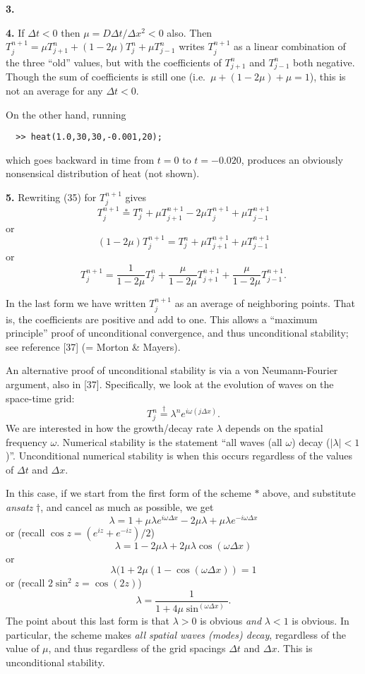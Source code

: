 \documentclass[10pt]{amsart}
\newcommand{\mfile}[1]{
\begin{quote}
\bigskip
\VerbatimInput[frame=single,label=\fbox{\normalsize \textsl{\,#1\,}},fontfamily=courier,fontsize=\small]{#1}
\end{quote}
}
\newcommand{\prob}[1]{\bigskip\noindent\large\textbf{#1.}\normalsize }
\begin{document}
\prob{3}

\mfile{heatwithloops.m}

\prob{4}  If $\Delta t < 0$ then $\mu = D \Delta t / \Delta x^2 < 0$ also.  Then $T_j^{n+1} = \mu T_{j+1}^n + (1 - 2 \mu) T_j^n + \mu T_{j-1}^n$ writes $T_j^{n+1}$ as a linear combination of the three ``old'' values, but with the coefficients of $T_{j+1}^n$ and $T_{j-1}^n$ both negative.  Though the sum of coefficients is still one (i.e.~$\mu + (1-2\mu) + \mu = 1$), this is not an average for any $\Delta t < 0$.

On the other hand, running
\begin{verbatim}
  >> heat(1.0,30,30,-0.001,20);
\end{verbatim}
which goes backward in time from $t=0$ to $t=-0.020$, produces an obviously nonsensical distribution of heat (not shown).

\prob{5}  Rewriting (35) for $T_j^{n+1}$ gives
    $$T_j^{n+1} \stackrel{\ast}{=} T_j^n + \mu T_{j+1}^{n+1} - 2 \mu T_j^{n+1} + \mu T_{j-1}^{n+1}$$
or
    $$(1 - 2\mu) T_j^{n+1} = T_j^n + \mu T_{j+1}^{n+1} + \mu T_{j-1}^{n+1}$$
or
    $$T_j^{n+1} = \frac{1}{1 - 2\mu} T_j^n + \frac{\mu}{1 - 2\mu} T_{j+1}^{n+1} + \frac{\mu}{1 - 2\mu} T_{j-1}^{n+1}.$$

In the last form we have written $T_j^{n+1}$ as an average of neighboring points.  That is, the coefficients are positive and add to one.  This allows a ``maximum principle'' proof of unconditional convergence, and thus unconditional stability; see reference [37] (= Morton \& Mayers).

An alternative proof of unconditional stability is via a von Neumann-Fourier argument, also in [37].  Specifically, we look at the evolution of waves on the space-time grid:
    $$T_j^n \stackrel{\dagger}{=} \lambda^n e^{i\omega (j\Delta x)}.$$
We are interested in how the growth/decay rate $\lambda$ depends on the spatial frequency $\omega$.  Numerical stability is the statement ``all waves (all $\omega$) decay ($|\lambda|<1$)''.  Unconditional numerical stability is when this occurs regardless of the values of $\Delta t$ and $\Delta x$.

In this case, if we start from the first form of the scheme $\ast$ above, and substitute \emph{ansatz} $\dagger$, and cancel as much as possible, we get
    $$\lambda = 1 + \mu \lambda e^{i\omega\Delta x} - 2 \mu \lambda + \mu \lambda e^{-i\omega\Delta x}$$
or (recall $\cos z = (e^{iz} + e^{-iz}) / 2$)
    $$\lambda = 1 - 2 \mu \lambda + 2 \mu \lambda \cos(\omega\Delta x)$$
or
    $$\lambda (1 + 2\mu (1 - \cos(\omega\Delta x)) = 1$$
or (recall $2 \sin^2 z = \cos(2z)$)
    $$\lambda = \frac{1}{1 + 4 \mu \sin^(\omega\Delta x)}.$$
The point about this last form is that $\lambda > 0$ is obvious \emph{and} $\lambda < 1$ is obvious.  In particular, the scheme makes \emph{all spatial waves (modes) decay}, regardless of the value of $\mu$, and thus regardless of the grid spacings $\Delta t$ and $\Delta x$.  This is unconditional stability.
\end{document}
